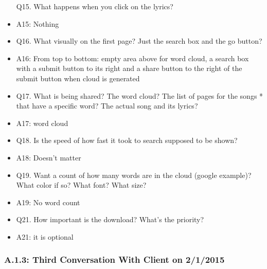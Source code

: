 \documentclass[]{article}
\begin{document}
\begin{itemize}
  Q15. What happens when you click on the lyrics?
\item
  A15: Nothing
\item
  Q16. What visually on the first page? Just the search box and the go
  button?
\item
  A16: From top to bottom: empty area above for word cloud, a search box
  with a submit button to its right and a share button to the right of
  the submit button when cloud is generated
\item
  Q17. What is being shared? The word cloud? The list of pages for the
  songs * that have a specific word? The actual song and its lyrics?
\item
  A17: word cloud
\item
  Q18. Is the speed of how fast it took to search supposed to be shown?
\item
  A18: Doesn't matter
\item
  Q19. Want a count of how many words are in the cloud (google example)?
  What color if so? What font? What size?
\item
  A19: No word count
\item
  Q21. How important is the download? What's the priority?
\item
  A21: it is optional
\end{itemize}

\subsubsection{A.1.3: Third Conversation With Client on
2/1/2015}\label{a.1.3-third-conversation-with-client-on-212015}
\end{document}
